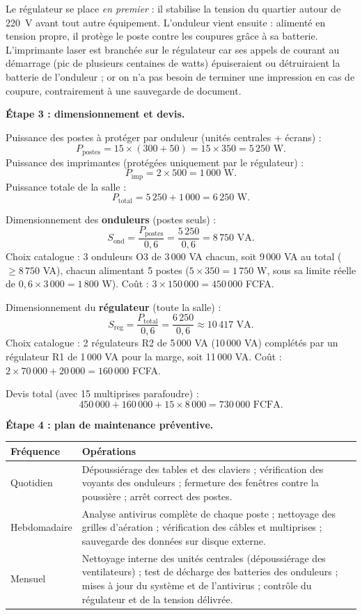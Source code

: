 \documentclass[11pt]{article}
\begin{document}
\begin{exoresolu}
Le régulateur se place \emph{en premier} : il stabilise la tension du quartier autour de \SI{220}{V} avant tout autre équipement. L'onduleur vient ensuite : alimenté en tension propre, il protège le poste contre les coupures grâce à sa batterie. L'imprimante laser est branchée sur le régulateur car ses appels de courant au démarrage (pic de plusieurs centaines de watts) épuiseraient ou détruiraient la batterie de l'onduleur ; or on n'a pas besoin de terminer une impression en cas de coupure, contrairement à une sauvegarde de document.

\textbf{Étape 3 : dimensionnement et devis.}

Puissance des postes à protéger par onduleur (unités centrales + écrans) :
\[ P_{\text{postes}} = 15 \times (300 + 50) = 15 \times 350 = 5\,250 \text{ W}. \]
Puissance des imprimantes (protégées uniquement par le régulateur) :
\[ P_{\text{imp}} = 2 \times 500 = 1\,000 \text{ W}. \]
Puissance totale de la salle :
\[ P_{\text{total}} = 5\,250 + 1\,000 = 6\,250 \text{ W}. \]

Dimensionnement des \textbf{onduleurs} (postes seuls) :
\[ S_{\text{ond}} = \frac{P_{\text{postes}}}{0,6} = \frac{5\,250}{0,6} = 8\,750 \text{ VA}. \]
Choix catalogue : 3 onduleurs O3 de 3\,000 VA chacun, soit 9\,000 VA au total ($\geq 8\,750$ VA), chacun alimentant 5 postes ($5 \times 350 = 1\,750$ W, sous sa limite réelle de $0,6 \times 3\,000 = 1\,800$ W). Coût : $3 \times 150\,000 = 450\,000$ FCFA.

Dimensionnement du \textbf{régulateur} (toute la salle) :
\[ S_{\text{reg}} = \frac{P_{\text{total}}}{0,6} = \frac{6\,250}{0,6} \approx 10\,417 \text{ VA}. \]
Choix catalogue : 2 régulateurs R2 de 5\,000 VA (10\,000 VA) complétés par un régulateur R1 de 1\,000 VA pour la marge, soit 11\,000 VA. Coût : $2 \times 70\,000 + 20\,000 = 160\,000$ FCFA.

Devis total (avec 15 multiprises parafoudre) :
\[ 450\,000 + 160\,000 + 15 \times 8\,000 = 730\,000 \text{ FCFA}. \]

\textbf{Étape 4 : plan de maintenance préventive.}

\begin{center}
\begin{tabularx}{\linewidth}{|l|X|}
\hline
\rowcolor{popblueL} \textbf{Fréquence} & \textbf{Opérations} \\
\hline
Quotidien & Dépoussiérage des tables et des claviers ; vérification des voyants des onduleurs ; fermeture des fenêtres contre la poussière ; arrêt correct des postes. \\
\hline
Hebdomadaire & Analyse antivirus complète de chaque poste ; nettoyage des grilles d'aération ; vérification des câbles et multiprises ; sauvegarde des données sur disque externe. \\
\hline
Mensuel & Nettoyage interne des unités centrales (dépoussiérage des ventilateurs) ; test de décharge des batteries des onduleurs ; mises à jour du système et de l'antivirus ; contrôle du régulateur et de la tension délivrée. \\
\hline
\end{tabularx}
\end{center}


\end{exoresolu}
\end{document}
